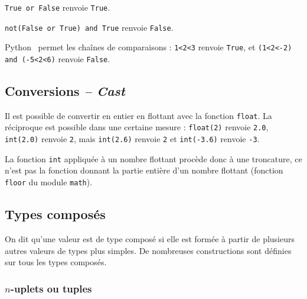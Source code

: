 \begin{exemple}
\texttt{True or False} renvoie \texttt{True}. 

\texttt{not(False or True) and True} renvoie \texttt{False}.
\end{exemple}

\begin{remarque}
Python \ permet les chaînes de comparaisons : \texttt{1<2<3} renvoie
\texttt{True}, et \texttt{(1<2<-2) and (-5<2<6)} renvoie \texttt{False}.
\end{remarque}

\subsection{Conversions \textit{-- Cast}}

Il est possible de convertir en entier en flottant avec la fonction \texttt{float}. La réciproque est possible dans une certaine 
mesure : \texttt{float(2)} renvoie \texttt{2.0}, \texttt{int(2.0)} renvoie \texttt{2}, mais \texttt{int(2.6)} renvoie \texttt{2} et 
\texttt{int(-3.6)} renvoie \texttt{-3}.

La fonction \texttt{int} appliquée à un nombre flottant procède donc à une troncature, ce n'est pas la fonction donnant la partie entière d'un nombre flottant (fonction \texttt{floor} du module \texttt{math}).

\subsection{Types composés}
\begin{defi}
On dit qu'une valeur est de type composé si elle est formée à partir de plusieurs autres 
valeurs de types plus simples. De nombreuses constructions sont définies sur tous les types 
composés.
\end{defi}

\subsubsection{$n$-uplets ou tuples}

